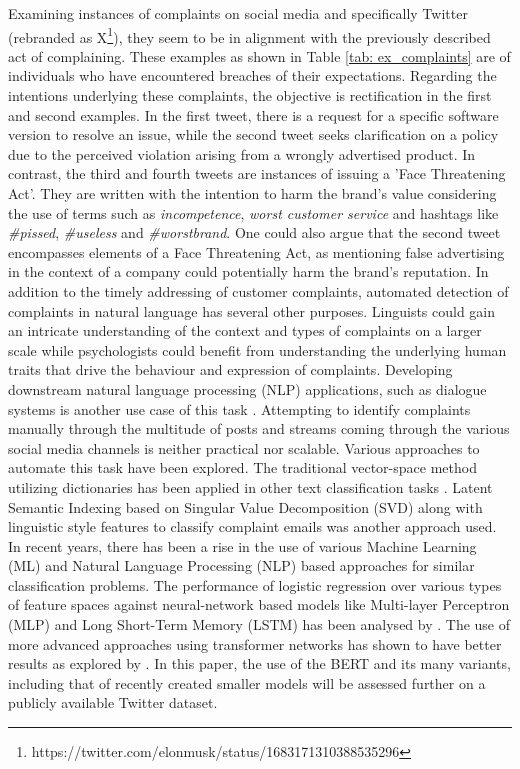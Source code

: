 Examining instances of complaints on social media and specifically Twitter (rebranded as X\footnote{https://twitter.com/elonmusk/status/1683171310388535296}), they seem to be in alignment with the previously described act of complaining. These examples as shown in Table \ref{tab: ex_complaints} are of individuals who have encountered breaches of their expectations. Regarding the intentions underlying these complaints, the objective is rectification in the first and second examples. In the first tweet, there is a request for a specific software version to resolve an issue, while the second tweet seeks clarification on a policy due to the perceived violation arising from a wrongly advertised product. In contrast, the third and fourth tweets are instances of issuing a 'Face Threatening Act'. They are written with the intention to harm the brand's value considering the use of terms such as \textit{incompetence}, \textit{worst customer service} and hashtags like \textit{\#pissed}, \textit{\#useless} and \textit{\#worstbrand}. One could also argue that the second tweet encompasses elements of a Face Threatening Act, as mentioning false advertising in the context of a company could potentially harm the brand's reputation.
\newline \newline
In addition to the timely addressing of customer complaints, automated detection of complaints in natural language has several other purposes. Linguists could gain an intricate understanding of the context and types of complaints on a larger scale while psychologists could benefit from understanding the underlying human traits that drive the behaviour and expression of complaints. Developing downstream natural language processing (NLP) applications, such as dialogue systems is another use case of this task \cite{preotiuc-pietro_automatically_2019}.
\newline \newline
Attempting to identify complaints manually through the multitude of posts and streams coming through the various social media channels is neither practical nor scalable. Various approaches to automate this task have been explored. The traditional vector-space method utilizing dictionaries has been applied in other text classification tasks \cite{liang_dictionary-based_2006}. Latent Semantic Indexing based on Singular Value Decomposition (SVD) along with linguistic style features to classify complaint emails was another approach used\cite{coussement_improving_2008}. In recent years, there has been a rise in the use of various Machine Learning (ML) and Natural Language Processing (NLP) based approaches for similar classification problems. The performance of logistic regression over various types of feature spaces against neural-network based models like Multi-layer Perceptron (MLP) and Long Short-Term Memory (LSTM) has been analysed by \cite{preotiuc-pietro_automatically_2019}. The use of more advanced approaches using transformer networks has shown to have better results as explored by \cite{jin_complaint_2020}. In this paper, the use of the BERT and its many variants, including that of recently created smaller models will be assessed further on a publicly available Twitter dataset.

